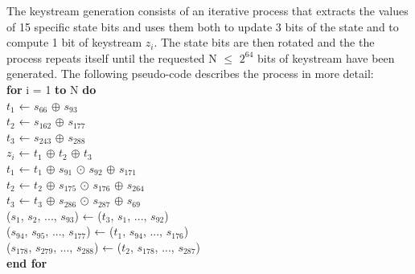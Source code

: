 \begin{enumerate}
		The keystream generation consists of an iterative process that extracts the values of 15 specific state bits and uses them both to update 3 bits of the state and to compute 1 bit of keystream $z_i$. The state bits are then rotated and the
		the process repeats itself until the requested N $\leq$ $2^{64}$ bits of keystream have been generated. The following pseudo-code describes the process in more detail:
		\vspace{0.5em}
		\\
		{\selectfont
			\textbf{for} i = 1 \textbf{to} N \textbf{do}\\
			\indent\hspace{1cm}$t_1$ ← $s_{66}$ $\oplus$ $s_{93}$\\
			\indent\hspace{1cm}$t_2$ ← $s_{162}$ $\oplus$ $s_{177}$\\
			\indent\hspace{1cm}$t_3$ ← $s_{243}$ $\oplus$ $s_{288}$\\
			\indent\hspace{1cm}$z_i$ ← $t_1$ $\oplus$ $t_2$ $\oplus$ $t_3$\\
			\indent\hspace{1cm}$t_1$ ← $t_1$ $\oplus$ $s_{91}$ $\odot$ $s_{92}$ $\oplus$ $s_{171}$\\
			\indent\hspace{1cm}$t_2$ ← $t_2$ $\oplus$ $s_{175}$ $\odot$ $s_{176}$ $\oplus$ $s_{264}$\\
			\indent\hspace{1cm}$t_3$ ← $t_3$ $\oplus$ $s_{286}$ $\odot$ $s_{287}$ $\oplus$ $s_{69}$\\
			\indent\hspace{1cm}($s_1$, $s_2$, ..., $s_{93}$) ← ($t_3$, $s_1$, ..., $s_{92}$)\\
			\indent\hspace{1cm}($s_{94}$, $s_{95}$, ..., $s_{177}$) ← ($t_1$, $s_{94}$, ..., $s_{176}$)\\
			\indent\hspace{1cm}($s_{178}$, $s_{279}$, ..., $s_{288}$) ← ($t_2$, $s_{178}$, ..., $s_{287}$)\\
			\textbf{end for}
		}
	\end{enumerate}
	

